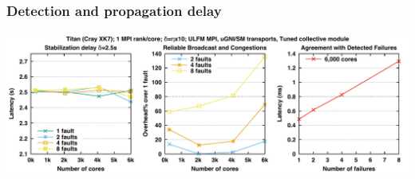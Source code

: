 







\begin{frame}
\frametitle{Detection and propagation delay}
\hspace*{-0.5cm}
\includegraphics[width=1.1\textwidth]{recva-titan.pdf}
\end{frame}

